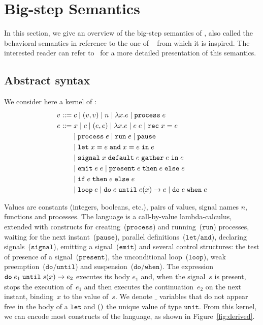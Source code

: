 \documentclass[9pt,preprint]{sigplanconf}
\newcommand{\sdeq}{::=}
\begin{document}
\section{Big-step Semantics}
\label{sec:semantics}

In this section, we give an overview of the big-step semantics of \rml{}, also called the behavioral semantics in reference to the one of \esterel~\cite{Berry:1997} from which it is inspired. The interested reader can refer to~\cite{Mandel:2005} for a more detailed presentation of this semantics.

\subsection{Abstract syntax}

We consider here a kernel of \rml{}:
%
\begin{align*}
v \sdeq &\; c \mid (v, v) \mid n \mid \elam{x}{e} \mid \eproc{e} \\
e \sdeq &\;  x \mid c \mid (e, e) \mid \elam{x}{e} 
  \mid \eapp{e}{e} \mid \erec{x}{e} \\
  & \mid \eproc{e} \mid \erun{e} \mid \epause{}  \\
& \mid \eletpar{x}{e}{x}{e}{e} \\
 &\mid \esig{x}{e}{e}{e} \\
 & \mid \eemit{e}{e} \mid \epres{e}{e}{e} \\
 & \mid \eite{e}{e}{e} \\
 &  \mid \eloop{e} \mid \euntil{e}{e}{x}{e} 
   \mid \ewhen{e}{e} 
\end{align*}

Values are constants (integers, booleans, etc.), pairs of values, signal names $n$, functions and processes. The language is a call-by-value lambda-calculus, extended with constructs for creating~($\mathtt{process}$) and running~($\mathtt{run}$) processes, waiting for the next instant~($\mathtt{pause}$), parallel definitions~($\mathtt{let/and}$), declaring signals~($\mathtt{signal}$), emitting a signal~($\mathtt{emit}$) and several control structures: the test of presence of a signal~($\mathtt{present}$), the unconditional loop~($\mathtt{loop}$), weak preemption~($\mathtt{do/until}$) and suspension~($\mathtt{do/when}$).  The expression $\mathtt{do}\; e_1 \;\mathtt{until}\; s(x) \rightarrow e_2$ executes its body $e_1$ and, when the signal~$s$ is present, stops the execution of~$e_1$ and then executes the continuation~$e_2$ on the next instant, binding~$x$ to the value of~$s$. We denote $\_$ variables that do not appear free in the body of a $\mathtt{let}$ and $\mathtt{()}{}$ the unique value of type $\mathtt{unit}$. From this kernel, we can encode most constructs of the language, as shown in Figure~\ref{fig:derived}.
\end{document}
